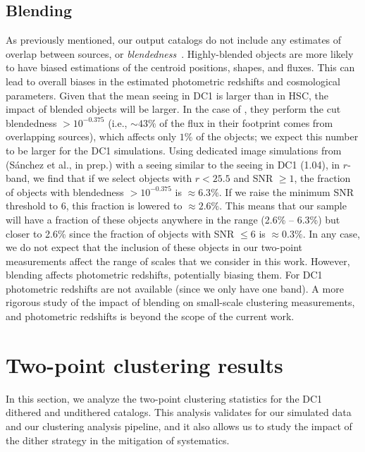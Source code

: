 \documentclass[a4paper,fleqn,usenatbib]{mnras}
\begin{document}
\subsection{Blending}
As previously mentioned, our output catalogs do not include any estimates of overlap between sources, or \textit{blendedness}~\citep{2018PASJ...70S...5B}. Highly-blended objects are more likely to have biased estimations of the centroid positions, shapes, and fluxes. This can lead to overall biases in the estimated photometric redshifts and cosmological parameters. Given that the mean seeing in DC1 is larger than in HSC, the impact of blended objects will be larger. In the case of \citet{2018PASJ...70S..25M}, they perform the cut blendedness $ >10^{-0.375}$ (i.e., $\sim 43\%$ of the flux in their footprint comes from overlapping sources), which affects only $1\%$ of the objects; we expect this number to be larger for the DC1 simulations. Using dedicated image simulations from (S\'{a}nchez et al., in prep.) with a seeing similar to the seeing in DC1 (1.04\arcsec), in $r$-band, we find that if we select objects with $r < 25.5$ and SNR $\geq 1$, the fraction of objects with blendedness $ >10^{-0.375}$ is $\approx 6.3\%$. If we raise the minimum SNR threshold to 6, this fraction is lowered to $\approx 2.6\%$. This means that our sample will have a fraction of these objects anywhere in the range (2.6\% -- 6.3\%) but closer to 2.6\% since the fraction of objects with SNR $\leq 6$ is $\approx 0.3\%$. In any case, we do not expect that the inclusion of these objects in our two-point measurements affect the range of scales that we consider in this work. However, blending affects photometric redshifts, potentially biasing them. For DC1 photometric redshifts are not available (since we only have one band). A more rigorous study of the impact of blending on small-scale clustering measurements, and photometric redshifts is beyond the scope of the current work.

\section{Two-point clustering results}
\label{sec:results}

In this section, we analyze the two-point clustering statistics for the DC1 dithered and undithered catalogs. This analysis validates for our simulated data and our clustering analysis pipeline, and it also allows us to study the impact of the dither strategy in the mitigation of systematics.
\end{document}
